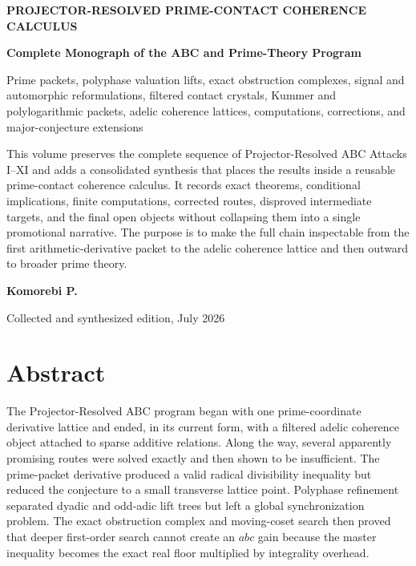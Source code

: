\frontmatter
\begin{titlepage}
\thispagestyle{empty}
\centering
\vspace*{0.52in}
{\Large\color{Blue}\bfseries PROJECTOR-RESOLVED PRIME-CONTACT COHERENCE CALCULUS\par}
\vspace{0.22in}
{\Huge\bfseries Complete Monograph of the ABC and Prime-Theory Program\par}
\vspace{0.20in}
{\Large\color{Muted}Prime packets, polyphase valuation lifts, exact obstruction complexes, signal and automorphic reformulations, filtered contact crystals, Kummer and polylogarithmic packets, adelic coherence lattices, computations, corrections, and major-conjecture extensions\par}
\vspace{0.50in}
\begin{minipage}{0.88\textwidth}
\large
This volume preserves the complete sequence of Projector-Resolved ABC Attacks I--XI and adds a consolidated synthesis that places the results inside a reusable prime-contact coherence calculus. It records exact theorems, conditional implications, finite computations, corrected routes, disproved intermediate targets, and the final open objects without collapsing them into a single promotional narrative. The purpose is to make the full chain inspectable from the first arithmetic-derivative packet to the adelic coherence lattice and then outward to broader prime theory.
\end{minipage}
\vfill
{\Large\bfseries Komorebi P.\par}
\vspace{0.30in}
{\large Collected and synthesized edition, July 2026\par}
\end{titlepage}

\chapter*{Abstract}
The Projector-Resolved ABC program began with one prime-coordinate derivative lattice and ended, in its current form, with a filtered adelic coherence object attached to sparse additive relations. Along the way, several apparently promising routes were solved exactly and then shown to be insufficient. The prime-packet derivative produced a valid radical divisibility inequality but reduced the conjecture to a small transverse lattice point. Polyphase refinement separated dyadic and odd-adic lift trees but left a global synchronization problem. The exact obstruction complex and moving-coset search then proved that deeper first-order search cannot create an $abc$ gain because the master inequality becomes the exact real floor multiplied by integrality overhead.


